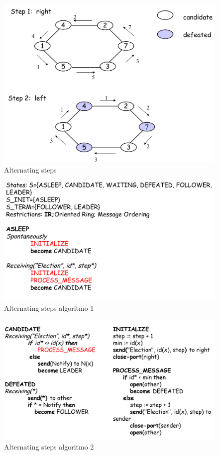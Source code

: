 \documentclass[12pt]{article}
\begin{document}
			\begin{figure}[h!]
				\centering
				\includegraphics[scale=0.30]{img/alternat.png}
				\caption{Alternating steps}
			\end{figure}
			\begin{figure}[h!]
				\centering
				\includegraphics[scale=0.40]{img/altalg.png}
				\caption{Alternating steps algoritmo 1}
			\end{figure}
			\begin{figure}[h!]
				\centering
				\includegraphics[scale=0.40]{img/altalg2.png}
				\caption{Alternating steps algoritmo 2}
			\end{figure}
\end{document}
